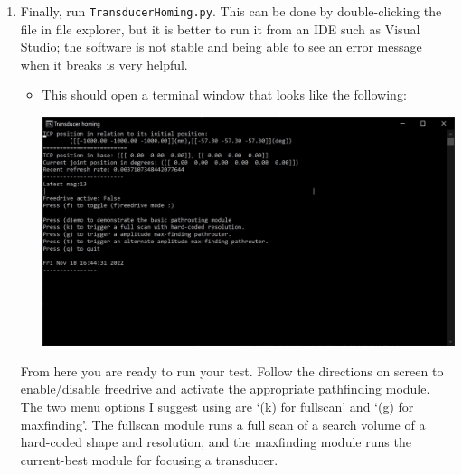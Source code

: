 \documentclass[11pt]{article}
\begin{document}
\begin{enumerate}
    \item Finally, run \texttt{TransducerHoming.py}. This can be done by double-clicking the file in file explorer, but it is better to run it from an IDE such as Visual Studio; the software is not stable and being able to see an error message when it breaks is very helpful.
    \begin{itemize}
        \item This should open a terminal window that looks like the following:
        \begin{center}
        \includegraphics*[width=\linewidth]{figures/TrasducerHoming_start_window.jpg}
        \end{center}
    \end{itemize}

From here you are ready to run your test. Follow the directions on screen to enable/disable freedrive and activate the appropriate pathfinding module. The two menu options I suggest using are `(k) for fullscan' and `(g) for maxfinding'. The fullscan module runs a full scan of a search volume of a hard-coded shape and resolution, and the maxfinding module runs the current-best module for focusing a transducer.
\end{enumerate}
\end{document}

